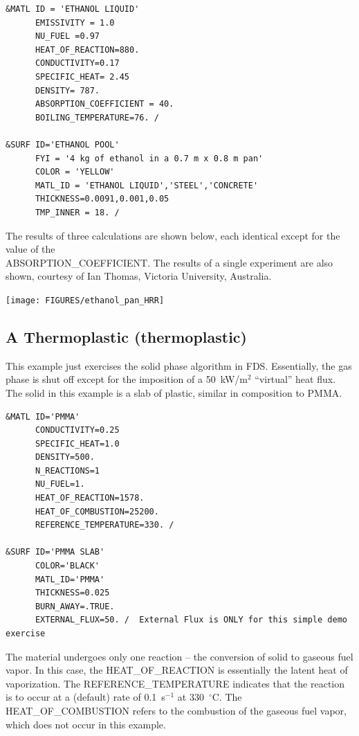 \documentclass[11pt]{book}
\begin{document}
\scriptsize
\begin{verbatim}
&MATL ID = 'ETHANOL LIQUID'
      EMISSIVITY = 1.0
      NU_FUEL =0.97
      HEAT_OF_REACTION=880.
      CONDUCTIVITY=0.17
      SPECIFIC_HEAT= 2.45
      DENSITY= 787.
      ABSORPTION_COEFFICIENT = 40.
      BOILING_TEMPERATURE=76. /

&SURF ID='ETHANOL POOL'
      FYI = '4 kg of ethanol in a 0.7 m x 0.8 m pan'
      COLOR = 'YELLOW'
      MATL_ID = 'ETHANOL LIQUID','STEEL','CONCRETE'
      THICKNESS=0.0091,0.001,0.05
      TMP_INNER = 18. /
\end{verbatim} \normalsize

\noindent
The results of three calculations are shown below, each identical except for the value of the \\ {\ct ABSORPTION\_COEFFICIENT}. The results of a single experiment
are also shown, courtesy of Ian Thomas, Victoria University, Australia.


\begin{center}
\texttt{[image: FIGURES/ethanol\_pan\_HRR]}
\end{center}



\clearpage
\subsection{A Thermoplastic ({\bf thermoplastic}) }

This example just exercises the solid phase algorithm in FDS. Essentially, the gas phase is shut off except for the imposition of a 50~kW/m$^2$ ``virtual''
heat flux. The solid in this example is a slab of plastic, similar in composition to PMMA.

\scriptsize
\begin{verbatim}
&MATL ID='PMMA'
      CONDUCTIVITY=0.25
      SPECIFIC_HEAT=1.0
      DENSITY=500.
      N_REACTIONS=1
      NU_FUEL=1.
      HEAT_OF_REACTION=1578.
      HEAT_OF_COMBUSTION=25200.
      REFERENCE_TEMPERATURE=330. /

&SURF ID='PMMA SLAB'
      COLOR='BLACK'
      MATL_ID='PMMA'
      THICKNESS=0.025
      BURN_AWAY=.TRUE.
      EXTERNAL_FLUX=50. /  External Flux is ONLY for this simple demo exercise
\end{verbatim} \normalsize

\noindent
The material undergoes only one reaction -- the conversion of solid to gaseous fuel vapor. In this case, the {\ct HEAT\_OF\_REACTION} is essentially the
latent heat of vaporization. The {\ct REFERENCE\_TEMPERATURE} indicates that the reaction is to occur at a (default) rate of 0.1~s$^{-1}$ at 330~$^\circ$C. The
{\ct HEAT\_OF\_COMBUSTION} refers to the combustion of the gaseous fuel vapor, which does not occur in this example.
\end{document}

